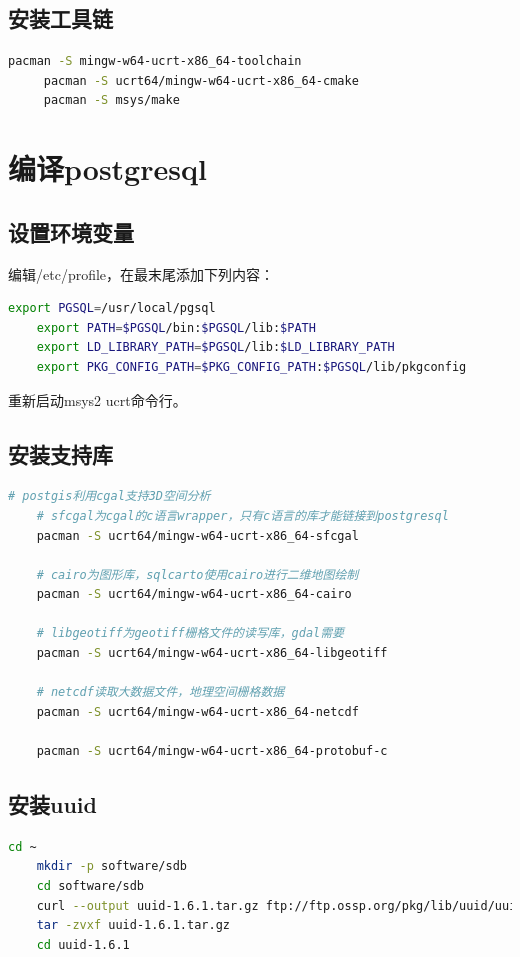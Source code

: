 \subsection{安装工具链}

\begin{lstlisting}[language=bash]
	 pacman -S mingw-w64-ucrt-x86_64-toolchain
	 pacman -S ucrt64/mingw-w64-ucrt-x86_64-cmake 
	 pacman -S msys/make
\end{lstlisting}

\section{编译postgresql}
\subsection{设置环境变量}
编辑/etc/profile，在最末尾添加下列内容：
\begin{lstlisting}[backgroundcolor = \color{codebackground}, language=bash]
	export PGSQL=/usr/local/pgsql
	export PATH=$PGSQL/bin:$PGSQL/lib:$PATH
	export LD_LIBRARY_PATH=$PGSQL/lib:$LD_LIBRARY_PATH
	export PKG_CONFIG_PATH=$PKG_CONFIG_PATH:$PGSQL/lib/pkgconfig
\end{lstlisting}
重新启动msys2 ucrt命令行。

\subsection{安装支持库}

\begin{lstlisting}[backgroundcolor = \color{codebackground}, language=bash]
	# postgis利用cgal支持3D空间分析
	# sfcgal为cgal的c语言wrapper，只有c语言的库才能链接到postgresql
	pacman -S ucrt64/mingw-w64-ucrt-x86_64-sfcgal 
	
	# cairo为图形库，sqlcarto使用cairo进行二维地图绘制
	pacman -S ucrt64/mingw-w64-ucrt-x86_64-cairo 
	
	# libgeotiff为geotiff栅格文件的读写库，gdal需要
	pacman -S ucrt64/mingw-w64-ucrt-x86_64-libgeotiff 
	
	# netcdf读取大数据文件，地理空间栅格数据
	pacman -S ucrt64/mingw-w64-ucrt-x86_64-netcdf
	
	pacman -S ucrt64/mingw-w64-ucrt-x86_64-protobuf-c
\end{lstlisting}


\subsection{安装uuid}
\begin{lstlisting}[backgroundcolor = \color{codebackground}, language=bash]
	cd ~
	mkdir -p software/sdb
	cd software/sdb
	curl --output uuid-1.6.1.tar.gz ftp://ftp.ossp.org/pkg/lib/uuid/uuid-1.6.1.tar.gz
	tar -zvxf uuid-1.6.1.tar.gz
	cd uuid-1.6.1
\end{lstlisting}

